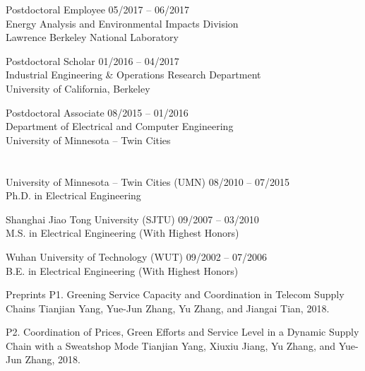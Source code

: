 \documentclass[margin,line]{res}
\begin{document}
\begin{resume}
Postdoctoral Employee \hfill  05/2017 -- 06/2017\\
Energy Analysis and Environmental Impacts Division \\
Lawrence Berkeley National Laboratory


Postdoctoral Scholar \hfill  01/2016 -- 04/2017\\
Industrial Engineering \& Operations Research Department\\
University of California, Berkeley  


Postdoctoral Associate \hfill  08/2015 -- 01/2016 \\
Department of Electrical and Computer Engineering  \\
University of Minnesota -- Twin Cities 
 
\vspace{.2cm}


\section{}

University of Minnesota -- Twin Cities (UMN)  \hfill  08/2010 -- 07/2015 \\
Ph.D. in Electrical Engineering 


Shanghai Jiao Tong University (SJTU)  \hfill  09/2007 -- 03/2010\\
M.S. in Electrical Engineering  (With Highest Honors)


Wuhan University of Technology (WUT)   \hfill  09/2002 -- 07/2006\\
B.E. in Electrical Engineering  (With Highest Honors)

\vspace{.2cm}





Preprints
P1. Greening Service Capacity and Coordination in Telecom Supply Chains
Tianjian Yang, Yue-Jun Zhang, Yu Zhang, and Jiangai Tian, 2018.

P2. Coordination of Prices, Green Efforts and Service Level in a Dynamic Supply Chain with a Sweatshop Mode
Tianjian Yang, Xiuxiu Jiang, Yu Zhang, and Yue-Jun Zhang, 2018.



\vspace{.2cm}


\section{}  


\end{resume}
\end{document}
